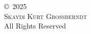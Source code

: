 \phantom{}\vspace{\fill}
\begin{center}
\copyright~2025\\
\textsc{Skaydi Kurt Grossberndt}\\
All Rights Reserved\\
\end{center}
